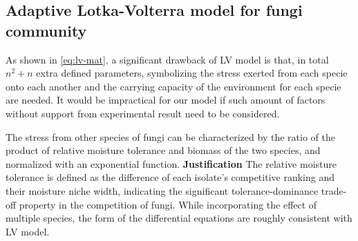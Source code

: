 



\subsection{Adaptive Lotka-Volterra model for fungi community}

As shown in \eqref{eq:lv-mat}, a significant drawback of LV model is that, in total $n^2 + n$ extra defined parameters, symbolizing the stress exerted from each specie onto each another and the carrying capacity of the environment for each specie are needed. It would be impractical for our model if such amount of factors without support from experimental result need to be considered.

\begin{definition}
    The stress from other species of fungi can be characterized by the ratio of the product of relative moisture tolerance and biomass of the two species, and normalized with an exponential function.
    \textbf{Justification} The relative moisture tolerance is defined as the difference of each isolate’s competitive ranking and their moisture niche width, indicating the significant tolerance-dominance trade-off property in the competition of fungi. While incorporating the effect of multiple species, the form of the differential equations are roughly consistent with LV model.
\end{definition}

